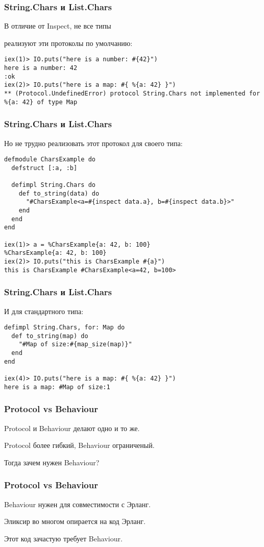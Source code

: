 \documentclass[10pt]{beamer}
\begin{document}
\begin{frame}[fragile]
  \frametitle{String.Chars и List.Chars}
  В отличие от Inspect, не все типы
  \par \bigskip
  реализуют эти протоколы по умолчанию:
  \par \bigskip
  \begin{lstlisting}
iex(1)> IO.puts("here is a number: #{42}")
here is a number: 42
:ok
iex(2)> IO.puts("here is a map: #{ %{a: 42} }")
** (Protocol.UndefinedError) protocol String.Chars not implemented for %{a: 42} of type Map
  \end{lstlisting}
\end{frame}

\begin{frame}[fragile]
  \frametitle{String.Chars и List.Chars}
  Но не трудно реализовать этот протокол для своего типа:
  \par \bigskip
  \begin{lstlisting}
defmodule CharsExample do
  defstruct [:a, :b]

  defimpl String.Chars do
    def to_string(data) do
      "#CharsExample<a=#{inspect data.a}, b=#{inspect data.b}>"
    end
  end
end

iex(1)> a = %CharsExample{a: 42, b: 100}
%CharsExample{a: 42, b: 100}
iex(2)> IO.puts("this is CharsExample #{a}")
this is CharsExample #CharsExample<a=42, b=100>
  \end{lstlisting}
\end{frame}

\begin{frame}[fragile]
  \frametitle{String.Chars и List.Chars}
  И для стандартного типа:
  \par \bigskip
  \begin{lstlisting}
defimpl String.Chars, for: Map do
  def to_string(map) do
    "#Map of size:#{map_size(map)}"
  end
end

iex(4)> IO.puts("here is a map: #{ %{a: 42} }")
here is a map: #Map of size:1
  \end{lstlisting}
\end{frame}

\begin{frame}
  \frametitle{Protocol vs Behaviour}
  Protocol и Behaviour делают одно и то же.
  \par \bigskip
  Protocol более гибкий, Behaviour ограниченый.
  \par \bigskip
  Тогда зачем нужен Behaviour?
\end{frame}

\begin{frame}
  \frametitle{Protocol vs Behaviour}
  Behaviour нужен для совместимости с Эрланг.
  \par \bigskip
  Эликсир во многом опирается на код Эрланг.
  \par \bigskip
  Этот код зачастую требует Behaviour.
\end{frame}
\end{document}
